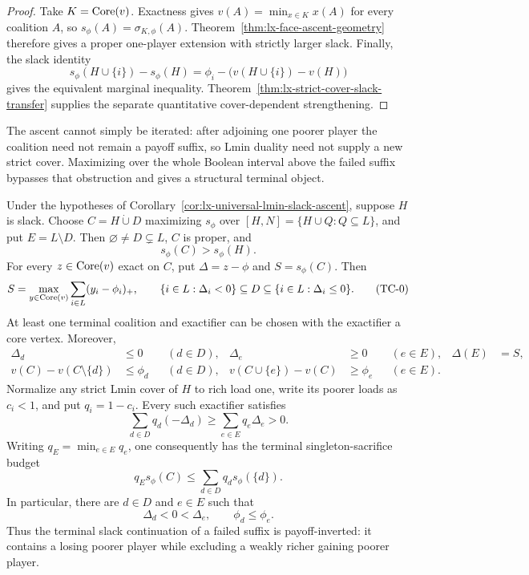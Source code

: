 \begin{proof}
Take $K=\operatorname{Core}(v)$.  Exactness gives
$v(A)=\min_{x\in K}x(A)$ for every coalition $A$, so
$s_\phi(A)=\sigma_{K,\phi}(A)$.  Theorem~\ref{thm:lx-face-ascent-geometry}
therefore gives a proper one-player extension with strictly larger slack.
Finally, the slack identity
\[
 s_\phi(H\cup\{i\})-s_\phi(H)
 =\phi_i-\bigl(v(H\cup\{i\})-v(H)\bigr)
\]
gives the equivalent marginal inequality.
Theorem~\ref{thm:lx-strict-cover-slack-transfer} supplies the separate
quantitative cover-dependent strengthening.
\end{proof}

The ascent cannot simply be iterated: after adjoining one poorer player the
coalition need not remain a payoff suffix, so Lmin duality need not supply a
new strict cover.  Maximizing over the whole Boolean interval above the
failed suffix bypasses that obstruction and gives a structural terminal
object.

\begin{theorem}
\label{thm:lx-terminal-slack-cut}
Under the hypotheses of
Corollary~\ref{cor:lx-universal-lmin-slack-ascent}, suppose $H$ is slack.
Choose $C=H\mathbin{\dot\cup}D$ maximizing $s_\phi$ over
$[H,N]=\{H\cup Q:Q\subseteq L\}$, and put $E=L\setminus D$.  Then
$\varnothing\ne D\subsetneq L$, $C$ is proper, and
\[
 s_\phi(C)>s_\phi(H).
\]
For every $z\in\operatorname{Core}(v)$ exact on $C$, put $\Delta=z-\phi$ and
$S=s_\phi(C)$.  Then
\[
 S=\max_{y\in\operatorname{Core}(v)}\sum_{i\in L}(y_i-\phi_i)_+, \qquad
 \{i\in L:\Delta_i<0\}\subseteq D
 \subseteq\{i\in L:\Delta_i\leq0\}.               \tag{TC-0}
 \label{eq:lx-terminal-sign-cell}
\]
At least one terminal coalition and exactifier can be chosen with the
exactifier a core vertex.  Moreover,
\begin{align}
 \Delta_d&\leq0 &&(d\in D),&
 \Delta_e&\geq0 &&(e\in E),&
 \Delta(E)&=S,                                      \tag{TC-1}
 \label{eq:lx-terminal-cut-signs}\\
 v(C)-v(C\setminus\{d\})&\leq\phi_d &&(d\in D),&
 v(C\cup\{e\})-v(C)&\geq\phi_e &&(e\in E).       \tag{TC-2}
 \label{eq:lx-terminal-cut-marginals}
\end{align}
Normalize any strict Lmin cover of $H$ to rich load one, write its poorer
loads as $c_i<1$, and put $q_i=1-c_i$.  Every such exactifier satisfies
\[
 \sum_{d\in D}q_d(-\Delta_d)
 \geq\sum_{e\in E}q_e\Delta_e>0.                   \tag{TC-3}
 \label{eq:lx-terminal-cut-budget}
\]
Writing $q_E=\min_{e\in E}q_e$, one consequently has the terminal
singleton-sacrifice budget
\[
 q_Es_\phi(C)
 \leq\sum_{d\in D}q_d s_\phi(\{d\}).               \tag{TC-4}
 \label{eq:lx-terminal-singleton-budget}
\]
In particular, there are $d\in D$ and $e\in E$ such that
\[
 \Delta_d<0<\Delta_e,
 \qquad \phi_d\leq\phi_e.                          \tag{TC-5}
 \label{eq:lx-terminal-cut-inversion}
\]
Thus the terminal slack continuation of a failed suffix is payoff-inverted:
it contains a losing poorer player while excluding a weakly richer gaining
poorer player.
\end{theorem}

